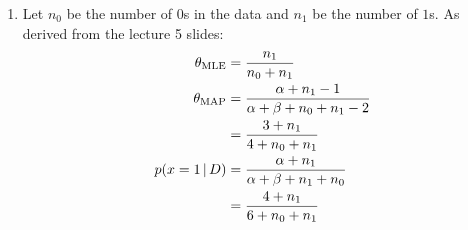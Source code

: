 \documentclass[submit]{harvardml}
\begin{document}
\begin{solution}
\begin{sol}
\begin{enumerate}
\item Let $n_0$ be the number of $0$s in the data and $n_1$ be the number of $1$s.
As derived from the lecture 5 slides:
\begin{align*}
\theta_{\textrm{MLE}} &= \frac{n_1}{n_0 + n_1}\\
\theta_{\textrm{MAP}} &= \frac{\alpha + n_1 - 1}{\alpha + \beta + n_0 + n_1 - 2}\\
&= \frac{3 + n_1}{4 + n_0 + n_1}\\
p(x=1 \,|\, D) &= \frac{\alpha + n_1}{\alpha + \beta + n_1 + n_0}\\
&= \frac{4 + n_1}{6 + n_0 + n_1}
\end{align*}


\end{enumerate}
\end{sol}
\end{solution}
\end{document}
